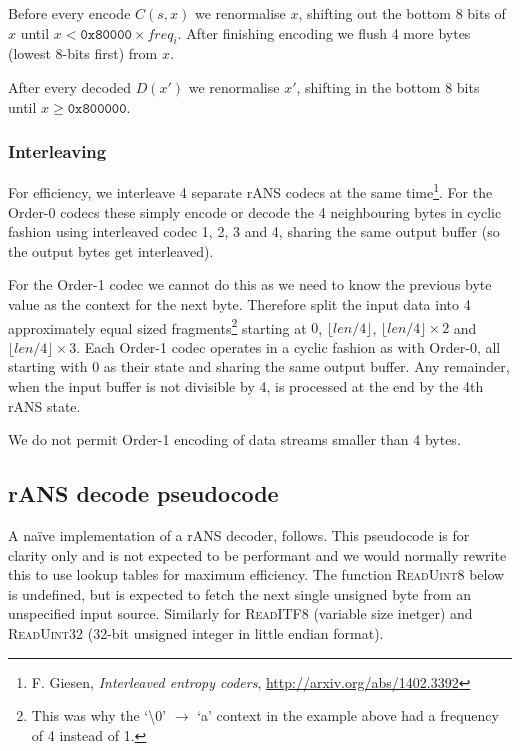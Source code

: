 \documentclass[a4paper]{article}
\begin{document}
Before every encode $C(s,x)$ we renormalise $x$, shifting out the bottom 8
bits of $x$ until $x < \mathtt{0x80000} \times freq_i$.  After finishing encoding we
flush 4 more bytes (lowest 8-bits first) from $x$.

After every decoded $D(x')$ we renormalise $x'$, shifting in the bottom 8
bits until $x \geq \mathtt{0x800000}$.


\subsubsection*{Interleaving}

For efficiency, we interleave 4 separate rANS codecs at the same
time\footnote{F. Giesen, \textit{Interleaved entropy coders},
  \url{http://arxiv.org/abs/1402.3392}}.  For the Order-0 codecs these
simply encode or decode the 4 neighbouring bytes in cyclic fashion
using interleaved codec 1, 2, 3 and 4, sharing the same output buffer
(so the output bytes get interleaved).

For the Order-1 codec we cannot do this as we need to know the
previous byte value as the context for the next byte.  Therefore split
the input data into 4 approximately equal sized
fragments\footnote{This was why the `\textbackslash0' $\to$ `a'
  context in the example above had a frequency of 4 instead of 1.}
starting at $0$, $\lfloor{}len/4\rfloor{}$,
$\lfloor{}len/4\rfloor{}\times2$ and $\lfloor{}len/4\rfloor{}\times 3$.  Each
Order-1 codec operates in a cyclic fashion as with Order-0, all
starting with 0 as their state and sharing the same output buffer. Any
remainder, when the input buffer is not divisible by 4, is processed at
the end by the 4th rANS state.

We do not permit Order-1 encoding of data streams smaller than 4
bytes.

\newpage
\subsection{rANS decode pseudocode}

A na\"ive implementation of a rANS decoder, follows.
This pseudocode is for clarity only and is not expected to be performant and we would normally rewrite this to use lookup tables for maximum efficiency.
The function \textsc{ReadUint8} below is undefined, but is expected to fetch the next single unsigned byte from an unspecified input source.  Similarly for \textsc{ReadITF8} (variable size inetger) and \textsc{ReadUint32} (32-bit unsigned integer in little endian format).
\end{document}
